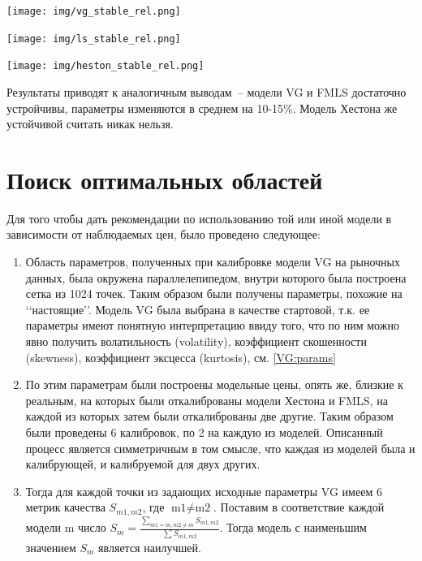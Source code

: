 \documentclass[oneside, final, 12pt, a4paper]{article}
\begin{document}
\begin{center}
  \texttt{[image: img/vg\_stable\_rel.png]}
\end{center}

\begin{center}
  \texttt{[image: img/ls\_stable\_rel.png]}
\end{center}

\begin{center}
  \texttt{[image: img/heston\_stable\_rel.png]}
\end{center}

Результаты приводят к аналогичным выводам~-- модели VG и FMLS достаточно устройчивы, параметры изменяются в среднем на 10-15\%. Модель Хестона же устойчивой считать никак нельзя.


\newpage
\section{Поиск оптимальных областей}
\label{VSK:label}
Для того чтобы дать рекомендации по использованию той или иной модели в зависимости от наблюдаемых цен, было проведено следующее:
\begin{enumerate}
\item Область параметров, полученных при калибровке модели VG на рыночных данных, была окружена параллелепипедом, внутри которого была построена сетка из 1024 точек. Таким образом были получены параметры, похожие на \lq\lq{}настоящие\rq\rq{}. Модель VG была выбрана в качестве стартовой, т.к. ее параметры имеют понятную интерпретацию ввиду того, что по ним можно явно получить волатильность (volatility), коэффициент скошенности (skewness), коэффициент эксцесса (kurtosis), см. \ref{VG:params}
\item По этим параметрам были построены модельные цены, опять же, близкие к реальным, на которых были откалиброваны модели Хестона и FMLS, на каждой из которых затем были откалиброваны две другие. Таким образом были проведены 6 калибровок, по 2 на каждую из моделей. Описанный процесс является симметричным в том смысле, что каждая из моделей была и калибрующей, и калибруемой для двух других.
\item Тогда для каждой точки из задающих исходные параметры VG имеем 6 метрик качества \( S_{m1, m2} \), где \( \text{m1} \not = \text{m2} \). Поставим в соответствие каждой модели m число \( S_m = \frac{\sum\limits_{m1 = m, m2 \not = m}{S_{m1, m2}}}{\sum{S_{m1, m2}}} \). Тогда модель с наименьшим значением $S_m$ является наилучшей.
\end{enumerate}
\end{document}
